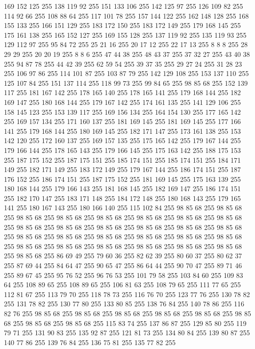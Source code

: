 169 152 125 255 138 119 92 255 151 133 106 255 142 125 97 255 126 109 82 255 114 92 66 255 108 88 64 255 117 101 78 255 157 144 122 255 162 148 128 255 168 155 133 255 166 151 129 255 183 172 150 255 183 172 149 255 179 168 145 255 175 161 138 255 165 152 127 255 169 155 128 255 137 119 92 255 135 119 93 255 129 112 97 255 95 84 72 255 25 21 16 255 20 17 12 255 22 17 13 255 8 8 8 255 28 29 29 255 20 20 19 255 8 8 6 255 47 44 38 255 48 43 37 255 37 32 27 255 43 40 38 255 94 87 78 255 44 42 39 255 62 59 54 255 39 37 35 255 29 27 24 255 31 28 23 255 106 97 86 255 114 101 87 255 103 87 79 255 142 129 108 255 153 137 110 255 125 107 84 255 151 137 114 255 118 99 73 255 99 84 65 255 98 85 68 255 152 139 117 255 181 167 142 255 178 165 140 255 178 165 141 255 179 168 144 255 182 169 147 255 180 168 144 255 179 167 142 255 174 161 135 255 141 129 106 255 158 145 123 255 153 139 117 255 169 156 134 255 164 154 130 255 177 165 142 255
169 157 134 255 171 160 137 255 181 169 145 255 181 169 145 255 177 166 141 255 179 168 144 255 180 169 145 255 182 171 147 255 173 161 138 255 153 142 120 255 172 160 137 255 169 157 135 255 175 165 142 255 179 167 144 255 179 166 144 255 178 165 143 255 179 166 145 255 175 163 142 255 188 175 153 255 187 175 152 255 187 175 151 255 185 174 151 255 185 174 151 255 184 171 149 255 182 171 149 255 183 172 149 255 179 167 144 255 186 174 151 255 187 176 152 255 186 174 151 255 187 175 152 255 181 169 145 255 175 163 139 255 180 168 144 255 179 166 143 255 181 168 145 255 182 169 147 255 186 174 151 255 182 170 147 255 183 171 148 255 184 172 148 255 180 168 143 255 179 165 141 255 180 167 143 255 180 166 140 255 115 102 84 255 98 85 68 255 98 85 68 255 98 85 68 255 98 85 68 255 98 85 68 255 98 85 68 255 98 85 68 255 98 85 68 255 98 85 68 255 98 85 68 255 98 85 68 255 98 85 68 255 98 85 68 255 98 85 68 255 98 85 68 255 98 85 68 255 98 85 68 255 98 85 68 255
98 85 68 255 98 85 68 255 98 85 68 255 98 85 68 255 98 85 68 255 98 85 68 255 98 85 68 255 98 85 68 255 98 85 68 255 86 69 49 255 79 60 36 255 82 62 39 255 80 60 37 255 80 62 37 255 87 69 44 255 84 64 47 255 90 65 47 255 86 64 44 255 90 70 47 255 89 71 46 255 89 67 45 255 95 76 52 255 96 76 53 255 101 79 58 255 103 84 60 255 109 83 64 255 108 89 65 255 108 89 65 255 106 81 63 255 108 79 65 255 111 77 65 255 112 81 67 255 113 79 70 255 118 78 73 255 116 76 70 255 123 77 76 255 130 78 82 255 131 78 82 255 130 77 80 255 133 80 85 255 138 76 84 255 140 78 86 255 116 82 76 255 98 85 68 255 98 85 68 255 98 85 68 255 98 85 68 255 98 85 68 255 98 85 68 255 98 85 68 255 98 85 68 255 115 83 74 255 137 86 87 255 129 85 80 255 119 79 71 255 131 90 83 255 135 92 87 255 121 81 73 255 134 80 84 255 139 80 87 255 140 77 86 255 139 76 84 255 136 75 81 255 135 77 82 255
